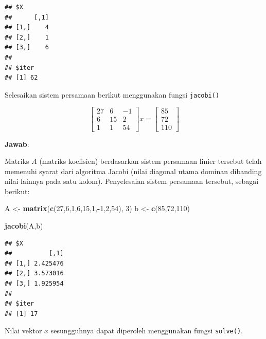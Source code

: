 \documentclass[]{book}
\newenvironment{Shaded}{\begin{snugshade}}{\end{snugshade}}
\newcommand{\DecValTok}[1]{\textcolor[rgb]{0.00,0.00,0.81}{#1}}
\newcommand{\KeywordTok}[1]{\textcolor[rgb]{0.13,0.29,0.53}{\textbf{#1}}}
\newcommand{\NormalTok}[1]{#1}
\newcommand{\OperatorTok}[1]{\textcolor[rgb]{0.81,0.36,0.00}{\textbf{#1}}}
\newcommand{\StringTok}[1]{\textcolor[rgb]{0.31,0.60,0.02}{#1}}
\theoremstyle{definition}
\theoremstyle{definition}
\theoremstyle{definition}
\theoremstyle{remark}
\let\BeginKnitrBlock\begin \let\EndKnitrBlock\end
\begin{document}
\begin{verbatim}
## $X
##      [,1]
## [1,]    4
## [2,]    1
## [3,]    6
## 
## $iter
## [1] 62
\end{verbatim}

\BeginKnitrBlock{example}
\protect\hypertarget{exm:jacobiexm2}{}{\label{exm:jacobiexm2} }Selesaikan sistem persamaan berikut menggunakan fungsi \texttt{jacobi()}
\EndKnitrBlock{example}

\[
\begin{bmatrix}
     27 & 6 & -1     \\[0.3em]
     6 & 15 & 2     \\[0.3em]
     1 & 1 & 54
\end{bmatrix}
x = \begin{bmatrix}
     85     \\[0.3em]
     72     \\[0.3em]
     110
\end{bmatrix}
\]

\textbf{Jawab}:

Matriks \(A\) (matriks koefisien) berdasarkan sistem persamaan linier tersebut telah memenuhi syarat dari algoritma Jacobi (nilai diagonal utama dominan dibanding nilai lainnya pada satu kolom). Penyelesaian sistem persamaan tersebut, sebagai berikut:

\begin{Shaded}
\begin{Highlighting}[]
\NormalTok{A <-}\StringTok{ }\KeywordTok{matrix}\NormalTok{(}\KeywordTok{c}\NormalTok{(}\DecValTok{27}\NormalTok{,}\DecValTok{6}\NormalTok{,}\DecValTok{1}\NormalTok{,}\DecValTok{6}\NormalTok{,}\DecValTok{15}\NormalTok{,}\DecValTok{1}\NormalTok{,}\OperatorTok{-}\DecValTok{1}\NormalTok{,}\DecValTok{2}\NormalTok{,}\DecValTok{54}\NormalTok{), }\DecValTok{3}\NormalTok{)}
\NormalTok{b <-}\StringTok{ }\KeywordTok{c}\NormalTok{(}\DecValTok{85}\NormalTok{,}\DecValTok{72}\NormalTok{,}\DecValTok{110}\NormalTok{)}

\KeywordTok{jacobi}\NormalTok{(A,b)}
\end{Highlighting}
\end{Shaded}

\begin{verbatim}
## $X
##          [,1]
## [1,] 2.425476
## [2,] 3.573016
## [3,] 1.925954
## 
## $iter
## [1] 17
\end{verbatim}

Nilai vektor \(x\) sesungguhnya dapat diperoleh menggunakan fungsi \texttt{solve()}.
\end{document}
